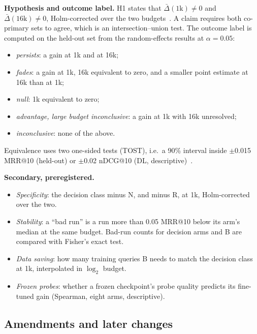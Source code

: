 \documentclass[journal]{IEEEtran}
\makeatletter
\newcommand{\ms}{MRR@10}
\newcommand{\nd}{nDCG@10}
\makeatother
\begin{document}
\textbf{Hypothesis and outcome label.} H1 states that $\bar\Delta(1\text{k})\neq0$ and $\bar\Delta(16\text{k})\neq0$, Holm-corrected over the two budgets~\cite{holm1979}. A claim requires both co-primary sets to agree, which is an intersection--union test. The outcome label is computed on the held-out set from the random-effects results at $\alpha=0.05$:
\begin{itemize}
\item \emph{persists}: a gain at 1k and at 16k;
\item \emph{fades}: a gain at 1k, 16k equivalent to zero, and a smaller point estimate at 16k than at 1k;
\item \emph{null}: 1k equivalent to zero;
\item \emph{advantage, large budget inconclusive}: a gain at 1k with 16k unresolved;
\item \emph{inconclusive}: none of the above.
\end{itemize}
Equivalence uses two one-sided tests (TOST), i.e.\ a 90\% interval inside $\pm$0.015 \ms{} (held-out) or $\pm$0.02 \nd{} (DL, descriptive)~\cite{schuirmann1987tost,lakens2017equivalence}.

\textbf{Secondary, preregistered.}
\begin{itemize}
\item \emph{Specificity}: the decision class minus N, and minus R, at 1k, Holm-corrected over the two.
\item \emph{Stability}: a ``bad run'' is a run more than 0.05 \ms{} below its arm's median at the same budget. Bad-run counts for decision arms and B are compared with Fisher's exact test.
\item \emph{Data saving}: how many training queries B needs to match the decision class at 1k, interpolated in $\log_2$ budget.
\item \emph{Frozen probes}: whether a frozen checkpoint's probe quality predicts its fine-tuned gain (Spearman, eight arms, descriptive).
\end{itemize}

\subsection{Amendments and later changes}
\label{sec:amend}
\end{document}
